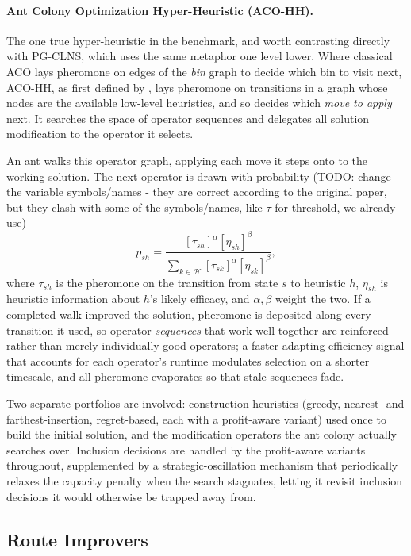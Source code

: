 \documentclass[orivec,runningheads]{llncs}
\begin{document}
\paragraph{Ant Colony Optimization Hyper-Heuristic (ACO-HH).}
The one true hyper-heuristic in the benchmark, and worth contrasting directly
with PG-CLNS, which uses the same metaphor one level lower. Where classical ACO
lays pheromone on edges of the \emph{bin} graph to decide which bin to visit
next, ACO-HH, as first defined by \cite{inproceedings}, lays pheromone on transitions in a graph whose nodes are the
available low-level heuristics, and so decides which \emph{move to apply} next.
It searches the space of operator sequences and delegates all solution
modification to the operator it selects.

An ant walks this operator graph, applying each move it steps onto to the working
solution. The next operator is drawn with probability (TODO: change the variable 
symbols/names - they are correct according to the original paper, but they clash
with some of the symbols/names, like $\tau$ for threshold, we already use)
\begin{equation}
    p_{sh} = \frac{[\tau_{sh}]^{\alpha}[\eta_{sh}]^{\beta}}
                  {\sum_{k \in \mathcal{H}} [\tau_{sk}]^{\alpha}[\eta_{sk}]^{\beta}},
\end{equation}
where $\tau_{sh}$ is the pheromone on the transition from state $s$ to heuristic
$h$, $\eta_{sh}$ is heuristic information about $h$'s likely efficacy, and
$\alpha,\beta$ weight the two. If a completed walk improved the solution,
pheromone is deposited along every transition it used, so operator
\emph{sequences} that work well together are reinforced rather than merely
individually good operators; a faster-adapting efficiency signal that accounts
for each operator's runtime modulates selection on a shorter timescale, and all
pheromone evaporates so that stale sequences fade.

Two separate portfolios are involved: construction heuristics (greedy,
nearest- and farthest-insertion, regret-based, each with a profit-aware variant)
used once to build the initial solution, and the modification operators the ant
colony actually searches over. Inclusion decisions are handled by the
profit-aware variants throughout, supplemented by a strategic-oscillation
mechanism that periodically relaxes the capacity penalty when the search
stagnates, letting it revisit inclusion decisions it would otherwise be trapped
away from.

\subsection{Route Improvers}
\end{document}
